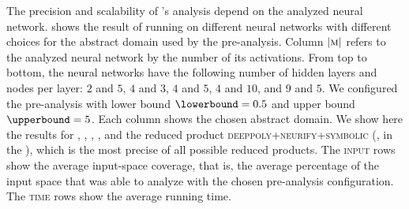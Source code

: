 The precision and scalability of \libra's analysis depend on the analyzed neural network.  shows the result of running \libra{} on different neural networks with different choices for the abstract domain used by the pre-analysis.
Column $|\textsc{m}|$ refers to the analyzed neural network by the number of its \relu{} activations. From top to bottom, the neural networks have the following number of hidden layers and nodes per layer: $2$ and $5$, $4$ and $3$, $4$ and $5$, $4$ and $10$, and $9$ and $5$.
We configured the pre-analysis with lower bound $\lowerbound = 0.5$ and upper bound $\upperbound = 5$. Each column shows the chosen abstract domain. We show here the results for \boxes, \symbolic, \deeppoly, \neurify, and the reduced product \textsc{deeppoly+neurify+symbolic} (\ie, \reducedproduct{} in the ), which is the most precise of all possible reduced products.
%
%
The \textsc{input} rows show the average input-space coverage, that is, the average
percentage of the input space that \libra{} was able to analyze with the chosen pre-analysis configuration.
The \textsc{time} rows show the average running time.

